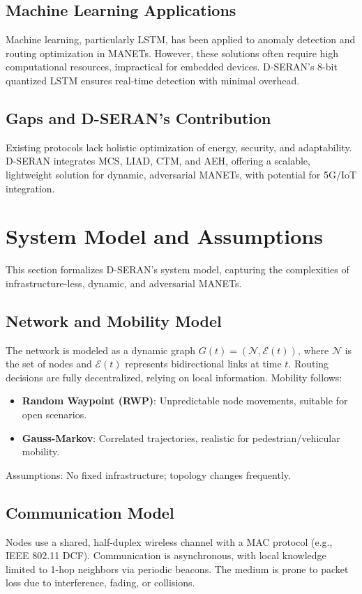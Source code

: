 \documentclass[preprint]{elsarticle}
\begin{document}
\subsection{Machine Learning Applications}
Machine learning, particularly LSTM, has been applied to anomaly detection \cite{15,16} and routing optimization \cite{17} in MANETs. However, these solutions often require high computational resources, impractical for embedded devices. D-SERAN’s 8-bit quantized LSTM ensures real-time detection with minimal overhead.

\subsection{Gaps and D-SERAN’s Contribution}
Existing protocols lack holistic optimization of energy, security, and adaptability. D-SERAN integrates MCS, LIAD, CTM, and AEH, offering a scalable, lightweight solution for dynamic, adversarial MANETs, with potential for 5G/IoT integration.

\section{System Model and Assumptions}
\label{sec:system_model}

This section formalizes D-SERAN’s system model, capturing the complexities of infrastructure-less, dynamic, and adversarial MANETs.

\subsection{Network and Mobility Model}
The network is modeled as a dynamic graph \( G(t) = (\mathcal{N}, \mathcal{E}(t)) \), where \( \mathcal{N} \) is the set of nodes and \( \mathcal{E}(t) \) represents bidirectional links at time \( t \). Routing decisions are fully decentralized, relying on local information. Mobility follows:
\begin{itemize}
    \item \textbf{Random Waypoint (RWP)}: Unpredictable node movements, suitable for open scenarios.
    \item \textbf{Gauss-Markov}: Correlated trajectories, realistic for pedestrian/vehicular mobility.
\end{itemize}
Assumptions: No fixed infrastructure; topology changes frequently.

\subsection{Communication Model}
Nodes use a shared, half-duplex wireless channel with a MAC protocol (e.g., IEEE 802.11 DCF). Communication is asynchronous, with local knowledge limited to 1-hop neighbors via periodic beacons. The medium is prone to packet loss due to interference, fading, or collisions.
\end{document}
